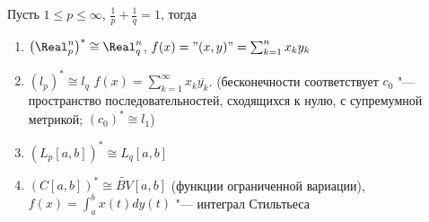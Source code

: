 \documentclass[main]{subfiles}
\begin{document}
\begin{exercise}
  Пусть $1 \le p \le \infty$, $\frac{1}{p} + \frac{1}{q} = 1$, тогда
  \begin{enumerate}
    \item $\left(\Real^n_p\right)^* \cong \Real^n_q$,
      $f(x) = "(x, y)" = \sum_{k=1}^n x_k y_k$
    \item $(l_p)^* \cong l_q$
      $f(x) = \sum_{k = 1}^\infty x_k \overline{y_k}$.
      (бесконечности соответствует $c_0$ "--- пространство
      последовательностей, сходящихся к нулю, с супремумной метрикой;
      $(c_0)^* \cong l_1$)
    \item $\left( L_p[a, b] \right)^* \cong L_q[a, b]$
    \item $\left( C[a,b] \right)^* \cong \widetilde{BV}[a,b]$
      (функции ограниченной вариации), $f(x) = \int_a^b x(t) dy(t)$ "---
      интеграл Стильтьеса
  \end{enumerate}
\end{exercise}
\end{document}
